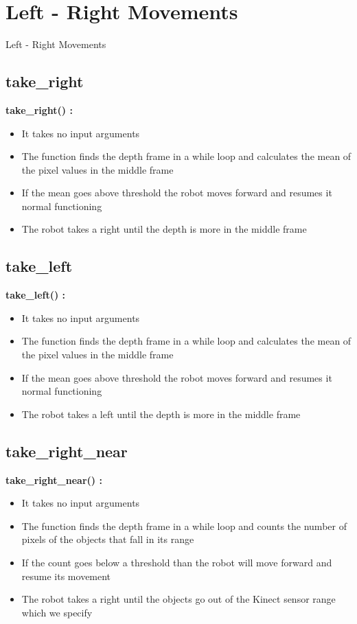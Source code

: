 \documentclass[10pt, a4paper]{beamer}
\begin{document}
\section{Left - Right Movements}
\begin{frame}[allowframebreaks]{Left - Right Movements}
  \subsection{take\_right}
    \textbf{take\_right() : }
      \begin{itemize}
	\item It takes no input arguments
	\item The function finds the depth frame in a while loop and calculates the mean of the pixel values in the middle frame
	\item If the mean goes above threshold the robot moves forward and resumes it normal functioning
	\item The robot takes a right until the depth is more in the middle frame
      \end{itemize}
\framebreak
  \subsection{take\_left}
    \textbf{take\_left() : }
      \begin{itemize}
	\item It takes no input arguments
	\item The function finds the depth frame in a while loop and calculates the mean of the pixel values in the middle frame
	\item If the mean goes above threshold the robot moves forward and resumes it normal functioning
	\item The robot takes a left until the depth is more in the middle frame
      \end{itemize}
\framebreak
  \subsection{take\_right\_near}
    \textbf{take\_right\_near() : }
      \begin{itemize}
       \item It takes no input arguments
       \item The function finds the depth frame in a while loop and counts the number of pixels of the objects that fall in its range
       \item If the count goes below a threshold than the robot will move forward and resume its movement
       \item The robot takes a right until the objects go out of the Kinect sensor range which we specify
      \end{itemize}
\framebreak

\end{frame}
\end{document}
